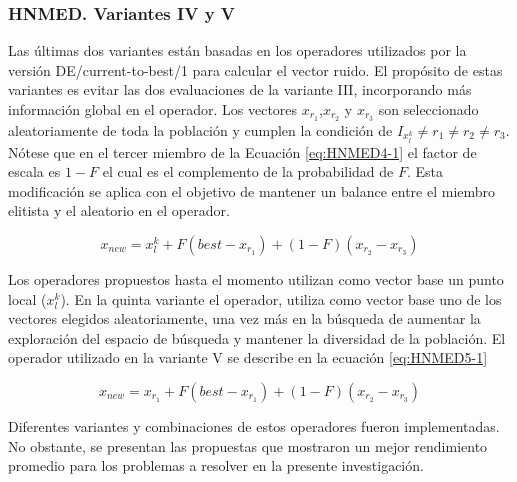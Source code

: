 \subsubsection{HNMED. Variantes IV y V }
Las últimas dos variantes están basadas en los operadores utilizados por la versión DE/current-to-best/1 para calcular el vector ruido. El propósito de estas variantes es evitar las dos evaluaciones de la variante III, incorporando más información global en el operador. Los vectores $x_{r_1}$,$x_{r_2}$ y $x_{r_3}$ son seleccionado aleatoriamente de toda la población y cumplen la condición de $ I_{x^k_l} \neq r_1 \neq r_2 \neq r_3$. Nótese que en el tercer miembro de la Ecuación \ref{eq:HNMED4-1} el factor de escala es $1-F$ el cual es el complemento de la probabilidad de $F$. Esta modificación se aplica con el objetivo de mantener un balance entre el miembro elitista y el aleatorio en el operador.
\begin{center}
\begin{equation}\label{eq:HNMED4-1}
x_{new}= x^k_l+F(best-x_{r_1})+(1-F)(x_{r_2}-x_{r_3})
\end{equation}
\end{center}
Los operadores propuestos hasta el momento utilizan como vector base un punto local ($x^k_l$). En la quinta variante el operador, utiliza como vector base uno de los vectores elegidos aleatoriamente, una vez más en la búsqueda de aumentar la exploración del espacio de búsqueda y mantener la diversidad de la población. El operador utilizado en la variante V se describe en la ecuación \ref{eq:HNMED5-1}
\begin{center}
\begin{equation}\label{eq:HNMED5-1}
x_{new}= x_{r_1}+F(best-x_{r_1})+(1-F)(x_{r_2}-x_{r_3})
\end{equation}
\end{center}
Diferentes variantes y combinaciones de estos operadores fueron implementadas. No obstante, se presentan las propuestas que mostraron un mejor rendimiento promedio para los problemas a resolver en la presente investigación. 
\\
